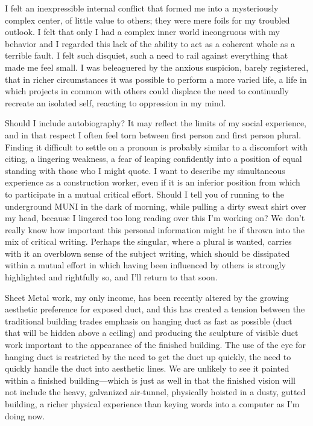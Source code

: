 \documentclass[
]{memoir}
\begin{document}
I felt an inexpressible internal conflict that formed me into a
mysteriously complex center, of little value to others; they were mere
foils for my troubled outlook. I felt that only I had a complex inner
world incongruous with my behavior and I regarded this lack of the
ability to act as a coherent whole as a terrible fault. I felt such
disquiet, such a need to rail against everything that made me feel
small. I was beleaguered by the anxious suspicion, barely registered,
that in richer circumstances it was possible to perform a more varied
life, a life in which projects in common with others could displace the
need to continually recreate an isolated self, reacting to oppression in
my mind.

Should I include autobiography? It may reflect the limits of my social
experience, and in that respect I often feel torn between first person
and first person plural. Finding it difficult to settle on a pronoun is
probably similar to a discomfort with citing, a lingering weakness, a
fear of leaping confidently into a position of equal standing with those
who I might quote. I want to describe my simultaneous experience as a
construction worker, even if it is an inferior position from which to
participate in a mutual critical effort. Should I tell you of running to
the underground MUNI in the dark of morning, while pulling a dirty sweat
shirt over my head, because I lingered too long reading over this I'm
working on? We don't really know how important this personal information
might be if thrown into the mix of critical writing. Perhaps the
singular, where a plural is wanted, carries with it an overblown sense
of the subject writing, which should be dissipated within a mutual
effort in which having been influenced by others is strongly highlighted
and rightfully so, and I'll return to that soon.

Sheet Metal work, my only income, has been recently altered by the
growing aesthetic preference for exposed duct, and this has created a
tension between the traditional building trades emphasis on hanging duct
as fast as possible (duct that will be hidden above a ceiling) and
producing the sculpture of visible duct work important to the appearance
of the finished building. The use of the eye for hanging duct is
restricted by the need to get the duct up quickly, the need to quickly
handle the duct into aesthetic lines. We are unlikely to see it painted
within a finished building---which is just as well in that the finished
vision will not include the heavy, galvanized air-tunnel, physically
hoisted in a dusty, gutted building, a richer physical experience than
keying words into a computer as I'm doing now.
\end{document}
